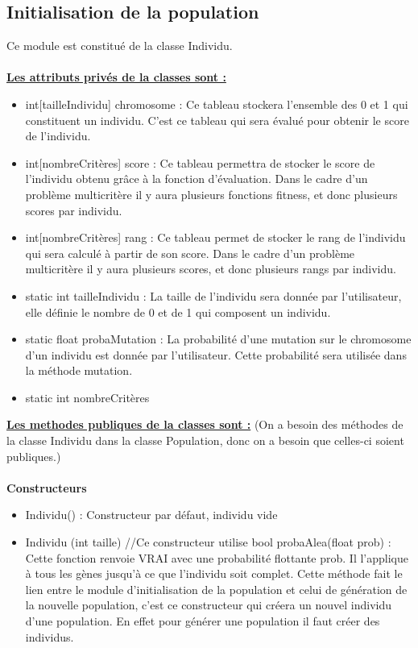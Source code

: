 \documentclass[a4paper,11pt]{article}
\begin{document}
		\subsection{Initialisation de la population}
			Ce module est constitué de la classe Individu.\\
			\\
			\underline{\bf Les attributs privés de la classes sont :}\\
				\begin{itemize}
				\item int[tailleIndividu] chromosome : Ce tableau stockera l’ensemble des 0 et 1 qui constituent un individu. C’est ce tableau qui sera évalué pour obtenir le score de l’individu.
				\item int[nombreCritères] score : Ce tableau permettra de stocker le score de l’individu obtenu grâce à la fonction d’évaluation. 
													Dans le cadre d’un problème multicritère il y aura plusieurs fonctions fitness, et donc plusieurs scores par individu.
				\item int[nombreCritères] rang : Ce tableau permet de stocker le rang de l’individu qui sera calculé à partir de son score. 
													Dans le cadre d’un problème multicritère il y aura plusieurs scores, et donc plusieurs rangs par individu. 
				\item static int tailleIndividu : La taille de l’individu sera donnée par l’utilisateur, elle définie le nombre de 0 et de 1 qui composent un individu.
				\item static float probaMutation : La probabilité d’une mutation sur le chromosome d’un individu est donnée par l’utilisateur. Cette probabilité sera utilisée dans la méthode mutation.
				\item static int nombreCritères\\
			\end{itemize}
			\underline{\bf Les methodes publiques de la classes sont :} (On a besoin des méthodes de la classe Individu dans la classe Population, donc on a besoin que celles-ci soient publiques.)\\\\
			\textbf{Constructeurs}
				\begin{itemize}
					\item Individu() : Constructeur par défaut, individu vide
					\item Individu (int taille) //Ce constructeur utilise bool probaAlea(float prob) : Cette fonction renvoie VRAI avec une probabilité flottante prob.
						Il l’applique à tous les gènes jusqu’à ce que l’individu soit complet.
						Cette méthode fait le lien entre le module d’initialisation de la population et celui de génération de la nouvelle population, c'est ce constructeur qui créera un nouvel individu d'une population. 
						En effet pour générer une population il faut créer des individus. 
				\end{itemize}
\end{document}
